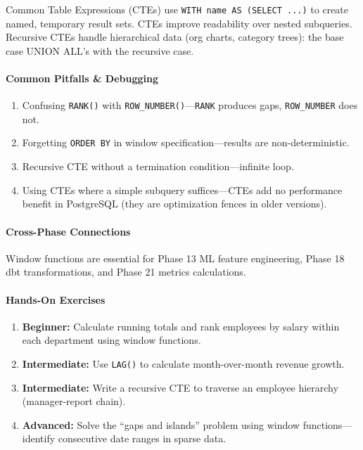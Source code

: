 \documentclass[11pt, a4paper, oneside]{report}
\begin{document}
Common Table Expressions (CTEs) use \texttt{WITH name AS (SELECT ...)} to create named, temporary result sets. CTEs improve readability over nested subqueries. Recursive CTEs handle hierarchical data (org charts, category trees): the base case UNION ALL's with the recursive case.

\paragraph{Common Pitfalls \& Debugging}
\begin{enumerate}[leftmargin=*]
\item Confusing \texttt{RANK()} with \texttt{ROW\_NUMBER()}---\texttt{RANK} produces gaps, \texttt{ROW\_NUMBER} does not.
\item Forgetting \texttt{ORDER BY} in window specification---results are non-deterministic.
\item Recursive CTE without a termination condition---infinite loop.
\item Using CTEs where a simple subquery suffices---CTEs add no performance benefit in PostgreSQL (they are optimization fences in older versions).
\end{enumerate}

\paragraph{Cross-Phase Connections} Window functions are essential for Phase 13 ML feature engineering, Phase 18 dbt transformations, and Phase 21 metrics calculations.

\paragraph{Hands-On Exercises}
\begin{enumerate}[leftmargin=*]
\item \textbf{Beginner:} Calculate running totals and rank employees by salary within each department using window functions.
\item \textbf{Intermediate:} Use \texttt{LAG()} to calculate month-over-month revenue growth.
\item \textbf{Intermediate:} Write a recursive CTE to traverse an employee hierarchy (manager-report chain).
\item \textbf{Advanced:} Solve the ``gaps and islands'' problem using window functions---identify consecutive date ranges in sparse data.
\end{enumerate}
\end{document}
